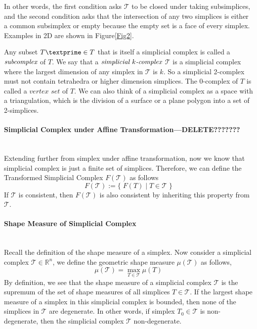     In other words, the first condition asks $\mathcal{T}$ to be closed under taking subsimplices, and the second condition asks that the intersection of any two simplices is either a common subsimplex or empty because the empty set is a face of every simplex. Examples in 2D are shown in Figure\ref{Fig2}. 

    Any subset ${T\textprime}\in{T}$ that is itself a simplicial complex is called a $\emph{subcomplex}$ of ${T}$. We say that a $\emph{simplicial $k$-complex}$ $\mathcal T$ is a simplicial complex where the largest dimension of any simplex in $\mathcal T$ is ${k}$. So a simplicial 2-complex must not contain tetrahedra or higher dimension simplices. The 0-complex of ${T}$ is called a $\textit{vertex set}$ of ${T}$. We can also think of a simplicial complex as a space with a triangulation, which is the division of a surface or a plane polygon into a set of 2-simplices. 

    \paragraph{Simplicial Complex under Affine Transformation---\textbf{DELETE???????}}\mbox{}\\
    Extending further from simplex under affine transformation, now we know that simplicial complex is just a finite set of simplices. Therefore, we can define the Transformed Simplicial Complex $F(\mathcal{T})$ as follows
    \begin{equation*}
    F(\mathcal{T}) := \{ \; F(T) \;\vert\; T \in \mathcal{T} \; \}
    \end{equation*}
    If $\mathcal{T}$ is consistent, then $F(\mathcal{T})$ is also consistent by inheriting this property from $\mathcal{T}$.

    \paragraph{Shape Measure of Simplicial Complex}\mbox{}\\
    Recall the definition of the shape measure of a simplex.
    Now consider a simplicial complex $\mathcal{T}\in\mathbb{R}^n$, we define the geometric shape measure $\mu(\mathcal{T})$ as follows,
    \begin{equation*}
    \mu(\mathcal{T}) = \max_{T \in \mathcal{T}} \mu(T)
    \end{equation*}
    By definition, we see that the shape measure of a simplicial complex $\mathcal{T}$ is the supremum of the set of shape measures of all simplices $T\in\mathcal{T}$. If the largest shape measure of a simplex in this simplicial complex is bounded, then none of the simplices in $\mathcal{T}$ are degenerate. In other words, if simplex $T_0 \in\mathcal{T}$ is non-degenerate, then the simplicial complex $\mathcal{T}$ non-degenerate.
